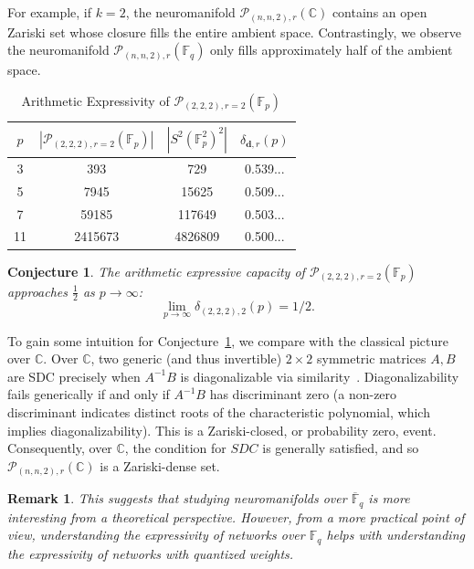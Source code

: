 \documentclass[a4paper]{cas-sc}
\newcommand{\dd}{\mathbf{d}}    %
\newcommand{\F}{\mathbb{F}}
\newcommand{\C}{\mathbb{C}}     %
\newtheorem{remark}[theorem]{Remark}
\newtheorem{conjecture}[theorem]{Conjecture}
\begin{document}
    For example, if $k=2$, the neuromanifold $\mathcal{P}_{(n,n,2),r}(\C)$ contains an open Zariski set whose closure fills the entire ambient space. Contrastingly, we observe the neuromanifold $\mathcal{P}_{(n,n,2),r}(\mathbb{F}_q)$ only fills approximately half of the ambient space.

    \begin{table}[!h]
        \centering
        \begin{tabular}{c|ccc}
             $p$ & $|\mathcal{P}_{(2,2,2), r = 2}(\F_p)|$ & $|S^2(\F_p^2)^2|$ & $\delta_{\dd,r}(p)$ \\ \hline
             3 & 393 & 729 & 0.539...\\
             5 & 7945 & 15625 & 0.509...\\
             7 & 59185 & 117649 & 0.503...\\
             11 & 2415673 & 4826809 & 0.500...
        \end{tabular}
        \caption{Arithmetic Expressivity of $\mathcal{P}_{(2,2,2), r = 2}(\F_p)$}
        \label{eq: 222-r=2}
    \end{table}
    \begin{conjecture} \label{conj: (2_2_2) over F_p}
        The arithmetic expressive capacity of $\mathcal{P}_{(2,2,2),r=2}(\F_p)$ approaches $\frac{1}{2}$ as $p \to \infty$:
        \[
            \lim_{p\to\infty}\delta_{(2,2,2),2}(p)=1/2.
        \]
    \end{conjecture}

    To gain some intuition for Conjecture~\ref{conj: (2_2_2) over F_p}, we compare with the classical picture over $\C$. Over $\mathbb{C}$, two generic (and thus invertible) $2 \times 2$ symmetric matrices $A,B$ are SDC precisely when $A^{-1}B$ is diagonalizable via similarity~\citep{BUSTAMANTE20}. Diagonalizability fails generically if and only if $A^{-1}B$ has discriminant zero (a non-zero discriminant indicates distinct roots of the characteristic polynomial, which implies diagonalizability). This is a Zariski-closed, or probability zero, event. Consequently, over $\C$, the condition for $SDC$ is generally satisfied, and so $\mathcal{P}_{(n,n,2),r}(\C)$ is a Zariski-dense set. 

    \begin{remark}
        This suggests that studying neuromanifolds over $\overline{\F}_q$ is more interesting from a theoretical perspective. However, from a more practical point of view, understanding the expressivity of networks over $\F_q$ helps with understanding the expressivity of networks with quantized weights.  
    \end{remark}
    
\end{document}
